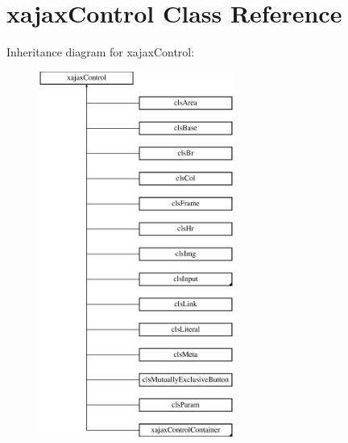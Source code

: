 \hypertarget{classxajaxControl}{
\section{xajaxControl Class Reference}
\label{classxajaxControl}
}
Inheritance diagram for xajaxControl:\begin{figure}[H]
\begin{center}
\leavevmode
\includegraphics[height=12.000000cm]{classxajaxControl}
\end{center}
\end{figure}
